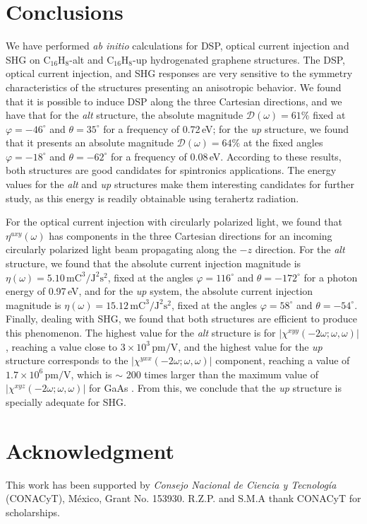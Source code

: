 \documentclass[pss]{wiley2sp} %
\begin{document}
\section{Conclusions}\label{sec:conclusions}

We have performed \emph{ab initio} calculations for DSP, optical current
injection and SHG on C$_{16}$H$_{8}$-alt and C$_{16}$H$_{8}$-up hydrogenated
graphene structures. The DSP, optical current injection, and SHG responses are
very sensitive to the symmetry characteristics of the structures presenting an
anisotropic behavior. We found that it is possible to induce DSP along the
three Cartesian directions, and we have that for the \emph{alt} structure, the
absolute magnitude $\mathcal{D}(\omega)=61\%$ fixed at $\varphi=-46^{\circ}$ and
$\theta=35^{\circ}$ for a frequency of 0.72\,eV; for the \emph{up} structure, we
found that it presents an absolute magnitude $\mathcal{D}(\omega)=64\%$ at the
fixed angles $\varphi=-18^{\circ}$ and $\theta=-62^{\circ}$ for a frequency of
0.08\,eV. According to these results, both structures are good candidates for
spintronics applications. The energy values for the \emph{alt} and \emph{up}
structures make them interesting candidates for further study, as this energy is
readily obtainable using terahertz radiation.

For the optical current injection with circularly polarized light, we found
that $\eta^{axy}(\omega)$ has components in the three Cartesian directions
for an incoming circularly polarized light beam propagating along the $-z$
direction. For the \emph{alt} structure, we found that the absolute current
injection magnitude is
$\eta(\omega)=5.10\,\mathrm{mC}^{3}/\mathrm{J}^{2}\mathrm{s}^{2}$, fixed at the
angles $\varphi=116^{\circ}$ and $\theta=-172^{\circ}$ for a photon energy of
0.97\,eV, and for the \emph{up} system, the absolute current injection magnitude
is $\eta(\omega)=15.12\,\mathrm{mC}^{3}/\mathrm{J}^{2}\mathrm{s}^{2}$, fixed at
the angles $\varphi=58^{\circ}$ and $\theta=-54^{\circ}$. Finally, dealing with
SHG, we found that both structures are efficient to produce this phenomenon.
The highest value for the \emph{alt} structure is for 
$|\chi^{xyy}(-2\omega;\omega,\omega)|$, reaching a value close to
$3\times10^{3}\,\mathrm{pm/V}$, and the highest value for the \emph{up} structure
corresponds to the $|\chi^{yxx}(-2\omega;\omega,\omega)|$
 component, reaching a
value of $1.7\times10^{6}\,\mathrm{pm/V}$,
which is $\sim$ 200 times larger than the maximum value of
$|\chi^{xyz}(-2\omega;\omega,\omega)|$ for
GaAs \cite{bergfeldPRL03}.
From this, we conclude that
the \emph{up} structure is specially adequate for SHG.


\section{Acknowledgment} %

This work has been supported by \emph{Consejo Nacional de Ciencia y
Tecnolog\'ia} (CONACyT), M\'exico, Grant No. 153930.
R.Z.P. and S.M.A thank CONACyT for scholarships.



\end{document}
